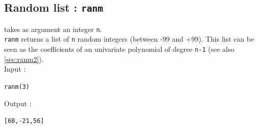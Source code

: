 \documentclass[a4paper,11pt]{book}
\begin{document}
\subsection{Random list : {\tt ranm}}\label{sec:ranm1}
 takes as argument an integer {\tt n}.\\
{\tt ranm} returns a list of {\tt n} random integers (between -99 and  +99).
This list can be seen as the coefficients of an univariate 
polynomial of degree {\tt n-1}
(see also \ref{sec:ranm2}).\\ %
Input :
\begin{center}{\tt ranm(3)}\end{center}
Output :
\begin{center}{\tt [68,-21,56]}\end{center}
\end{document}
